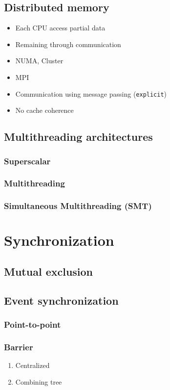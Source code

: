 \documentclass[11pt]{article}
\begin{document}
\subsection{Distributed memory}
\label{sec:orgeecbb42}
\begin{itemize}
\item Each CPU access partial data
\item Remaining through communication
\item NUMA, Cluster
\item MPI
\item Communication using message passing (\texttt{explicit})
\item No cache coherence
\end{itemize}
\subsection{Multithreading architectures}
\label{sec:org242fb13}
\subsubsection{Superscalar}
\label{sec:org441a71f}
\subsubsection{Multithreading}
\label{sec:org657c63e}
\subsubsection{Simultaneous Multithreading (SMT)}
\label{sec:org0678268}
\section{Synchronization}
\label{sec:org2778e7e}
\subsection{Mutual exclusion}
\label{sec:org1312fba}
\subsection{Event synchronization}
\label{sec:orgdf52891}
\subsubsection{Point-to-point}
\label{sec:org8009fbe}
\subsubsection{Barrier}
\label{sec:org9e027aa}
\begin{enumerate}
\item Centralized
\label{sec:org2fe6fec}
\item Combining tree
\label{sec:orga7fd977}
\end{enumerate}
\end{document}
